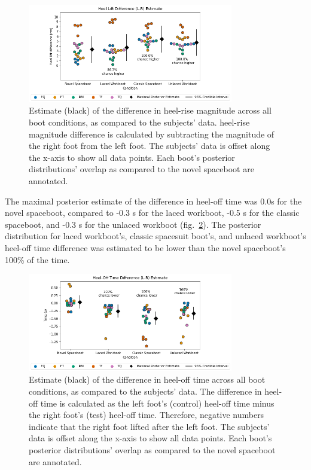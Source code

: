 \documentclass[defaultstyle,11pt]{thesis}
\begin{document}
\hypertarget{fig:SA4-HLD}{%
\begin{figure}
\centering
\includegraphics[width=0.8\textwidth,height=\textheight]{../fig/SA4/HeelLiftDiff.png}
\caption[{Heel-rise magnitude difference posterior estimate}]{Estimate (black) of the difference in heel-rise magnitude across all boot conditions, as compared to the subjects' data. heel-rise magnitude difference is calculated by subtracting the magnitude of the right foot from the left foot. The subjects' data is offset along the x-axis to show all data points. Each boot's posterior distributions' overlap as compared to the novel spaceboot are annotated.}
\label{fig:SA4-HLD}
\end{figure}
}

The maximal posterior estimate of the difference in heel-off time was 0.0s for the novel spaceboot, compared to -0.3 s for the laced workboot, -0.5 s for the classic spaceboot, and -0.3 s for the unlaced workboot (fig.~\ref{fig:SA4-HOT}).
The posterior distribution for laced workboot's, classic spacesuit boot's, and unlaced workboot's heel-off time difference was estimated to be lower than the novel spaceboot's 100\% of the time.

\hypertarget{fig:SA4-HOT}{%
\begin{figure}
\centering
\includegraphics[width=0.8\textwidth,height=\textheight]{../fig/SA4/HO_Time_Diff.png}
\caption[{Heel-off time difference posterior estimates}]{Estimate (black) of the difference in heel-off time across all boot conditions, as compared to the subjects' data. The difference in heel-off time is calculated as the left foot's (control) heel-off time minus the right foot's (test) heel-off time. Therefore, negative numbers indicate that the right foot lifted after the left foot. The subjects' data is offset along the x-axis to show all data points. Each boot's posterior distributions' overlap as compared to the novel spaceboot are annotated.}
\label{fig:SA4-HOT}
\end{figure}
}
\end{document}
